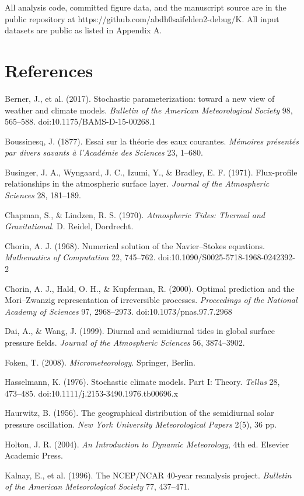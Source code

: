 \documentclass[aps,prfluids,preprint,superscriptaddress,nofootinbib]{revtex4-2}
\begin{document}
All analysis code, committed figure data, and the manuscript source are in the public repository at https://github.com/abdh0saifelden2-debug/K. All input datasets are public as listed in Appendix A.

\section*{References}

Berner, J., et al. (2017). Stochastic parameterization: toward a new view of weather and climate models. \emph{Bulletin of the American Meteorological Society} 98, 565--588. doi:10.1175/BAMS-D-15-00268.1

Boussinesq, J. (1877). Essai sur la th\'eorie des eaux courantes. \emph{M\'emoires pr\'esent\'es par divers savants \`a l'Acad\'emie des Sciences} 23, 1--680.

Businger, J. A., Wyngaard, J. C., Izumi, Y., \& Bradley, E. F. (1971). Flux-profile relationships in the atmospheric surface layer. \emph{Journal of the Atmospheric Sciences} 28, 181--189.

Chapman, S., \& Lindzen, R. S. (1970). \emph{Atmospheric Tides: Thermal and Gravitational}. D. Reidel, Dordrecht.

Chorin, A. J. (1968). Numerical solution of the Navier--Stokes equations. \emph{Mathematics of Computation} 22, 745--762. doi:10.1090/S0025-5718-1968-0242392-2

Chorin, A. J., Hald, O. H., \& Kupferman, R. (2000). Optimal prediction and the Mori--Zwanzig representation of irreversible processes. \emph{Proceedings of the National Academy of Sciences} 97, 2968--2973. doi:10.1073/pnas.97.7.2968

Dai, A., \& Wang, J. (1999). Diurnal and semidiurnal tides in global surface pressure fields. \emph{Journal of the Atmospheric Sciences} 56, 3874--3902.

Foken, T. (2008). \emph{Micrometeorology}. Springer, Berlin.

Hasselmann, K. (1976). Stochastic climate models. Part I: Theory. \emph{Tellus} 28, 473--485. doi:10.1111/j.2153-3490.1976.tb00696.x

Haurwitz, B. (1956). The geographical distribution of the semidiurnal solar pressure oscillation. \emph{New York University Meteorological Papers} 2(5), 36 pp.

Holton, J. R. (2004). \emph{An Introduction to Dynamic Meteorology}, 4th ed. Elsevier Academic Press.

Kalnay, E., et al. (1996). The NCEP/NCAR 40-year reanalysis project. \emph{Bulletin of the American Meteorological Society} 77, 437--471.
\end{document}
